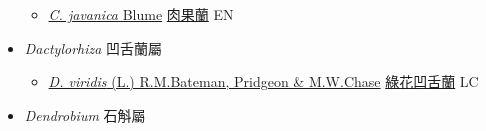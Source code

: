 \begin{itemize}
  \begin{itemize}
        \item[] \href{http://www.theplantlist.org/tpl1.1/search?q=Cyrtosia+javanica}{\textit{C. javanica} Blume}   \href{\detokenize{http://taibnet.sinica.edu.tw/chi/taibnet_species_list.php?T2=肉果蘭&T2_new_value=true&fr=y}}{肉果蘭} EN
  \end{itemize}
 \item[] \textit{Dactylorhiza} 凹舌蘭屬
                    
  \begin{itemize}
        \item[] \href{http://www.theplantlist.org/tpl1.1/search?q=Dactylorhiza+viridis}{\textit{D. viridis} (L.) R.M.Bateman, Pridgeon \& M.W.Chase}     \href{\detokenize{http://taibnet.sinica.edu.tw/chi/taibnet_species_list.php?T2=綠花凹舌蘭&T2_new_value=true&fr=y}}{綠花凹舌蘭} LC
  \end{itemize}
 \item[] \textit{Dendrobium} 石斛屬
                    

\end{itemize}

